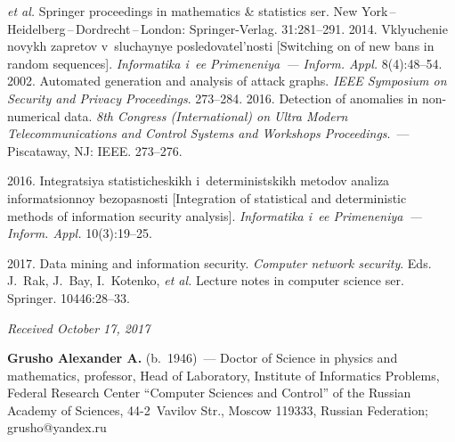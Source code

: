 \begin{multicols}{2}
{{\begin{thebibliography}{99}
     \textit{et al.} Springer proceedings in mathematics \& statistics ser.    
New York\,--\,Heidelberg\,--\,Dordrecht\,--\,London: Springer-Verlag.  31:281--291.
      2014. Vklyu\-che\-nie novykh zapretov 
v~sluchaynye posledovatel'nosti [Switching on of new bans in random sequences]. 
\textit{Informatika i~ee Primeneniya~--- Inform. Appl.} 8(4):48--54.
      2002. Automated 
generation and analysis of attack graphs. \textit{IEEE Symposium on Security and Privacy 
Proceedings}.  273--284.
      2016. Detection of anomalies in  
non-numerical data. \textit{8th Congress (International) on Ultra Modern Telecommunications and 
Control Systems and Workshops Proceedings}.~---  Piscataway, NJ: IEEE.  273--276.
     
      2016. 
Integratsiya statisticheskikh i~deterministskikh metodov analiza informatsionnoy bezopasnosti 
[Integration of statistical and deterministic methods of information security analysis]. 
\textit{Informatika i~ee Primeneniya~--- Inform. Appl.} 10(3):19--25.

      2017. Data mining and information security. 
     \textit{Computer network security}. Eds. J.~Rak, J.~Bay, I.~Kotenko,
     \textit{et al.}
{Lecture notes in 
computer science ser.} Springer. 10446:28--33. 

\end{thebibliography}

 }
 }

\end{multicols}

\vspace*{-6pt}

\hfill{\small\textit{Received October 17, 2017}}


\Contr


\noindent
\textbf{Grusho Alexander A.} (b.\ 1946)~--- 
Doctor of Science in physics and mathematics, professor,  Head of Laboratory, 
Institute of Informatics Problems, Federal Research Center ``Computer 
Sciences and Control'' of the Russian Academy of Sciences, 44-2~Vavilov Str., Moscow 
119333, Russian Federation; \mbox{grusho@yandex.ru}

